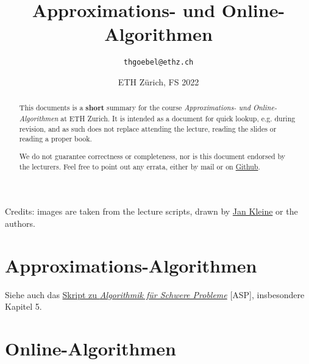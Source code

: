 \documentclass[paper=a4, parskip=half-]{scrartcl}
\title{Approximations- und Online-Algorithmen}
\author{\texttt{thgoebel@ethz.ch}}
\date{ETH Zürich, FS 2022}
\begin{document}
\begin{titlepage}
\maketitle
\vspace{5cm}
\thispagestyle{empty}


\begin{abstract}
This documents is a \textbf{short} summary for the course
\textit{Approximations- und Online-Algorithmen} at ETH Zurich.
It is intended as a document for quick lookup, e.g. during revision,
and as such does not replace attending the lecture, reading the slides or reading a proper book.

We do not guarantee correctness or completeness, nor is this document endorsed by the lecturers.
Feel free to point out any errata, either by mail or on
\href{https://github.com/eth-cs-student-summaries/Approximations-und-Online-Algorithmen}{Github}.
\end{abstract}

\end{titlepage}

\tableofcontents
\vfill
\listoffigures

Credits: images are taken from the lecture scripts, drawn by \href{mailto:jkleine@ethz.ch}{Jan Kleine}
or the authors.

\newpage

\part{Approximations-Algorithmen}

Siehe auch das \href{https://github.com/eth-cs-student-summaries/Algorithmik-fuer-Schwere-Probleme/}
{Skript zu \emph{Algorithmik für Schwere Probleme}} [ASP], insbesondere Kapitel 5.


\newpage


\newpage


\newpage


\newpage

\newpage

\newpage

\newpage


\part{Online-Algorithmen}


\newpage


\newpage


\newpage


\newpage
\end{document}
